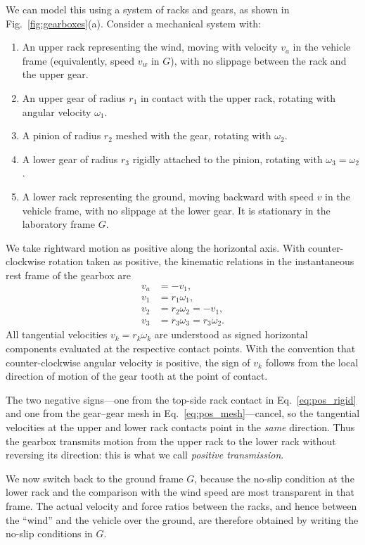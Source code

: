 \documentclass[reprint,aps,pra,longbibliography]{revtex4-2}
\begin{document}
We can model this using a system of racks and gears, as shown in Fig.~\ref{fig:gearboxes}(a). Consider a mechanical system with:
\begin{enumerate}
\item An upper rack representing the wind, moving with velocity $v_a$ in the vehicle frame (equivalently, speed $v_w$ in $G$), with no slippage between the rack and the upper gear.
\item An upper gear of radius $r_1$ in contact with the upper rack, rotating with angular velocity $\omega_1$.
\item A pinion of radius $r_2$ meshed with the gear, rotating with $\omega_2$.
\item A lower gear of radius $r_3$ rigidly attached to the pinion, rotating with $\omega_3 = \omega_2$.
\item A lower rack representing the ground, moving backward with speed $v$ in the vehicle frame, with no slippage at the lower gear. It is stationary in the laboratory frame $G$.
\end{enumerate}

We take rightward motion as positive along the horizontal axis.
With counter-clockwise rotation taken as positive, the kinematic relations in
the instantaneous rest frame of the gearbox are
\begin{align}
v_a &= -v_1,  \label{eq:pos_rigid}\\
v_1 &= r_1 \omega_1,\\
v_2 &= r_2 \omega_2 = -v_1, \label{eq:pos_mesh}\\
v_3 &= r_3 \omega_3 = r_3 \omega_2.
\end{align}
All tangential velocities \(v_k = r_k \omega_k\) are understood as signed horizontal
components evaluated at the respective contact points. With the convention that
counter-clockwise angular velocity is positive, the sign of \(v_k\) follows from the
local direction of motion of the gear tooth at the point of contact.

The two negative signs---one from the top-side rack contact in
Eq.~\eqref{eq:pos_rigid} and one from the gear--gear mesh in
Eq.~\eqref{eq:pos_mesh}---cancel, so the tangential velocities at the upper and
lower rack contacts point in the \emph{same} direction. Thus the gearbox
transmits motion from the upper rack to the lower rack without reversing its
direction: this is what we call \emph{positive transmission}.

We now switch back to the ground frame \(G\), because the no-slip condition at
the lower rack and the comparison with the wind speed are most transparent in
that frame. The actual velocity and force ratios between the racks, and hence
between the ``wind'' and the vehicle over the ground, are therefore obtained by
writing the no-slip conditions in \(G\).
\end{document}
